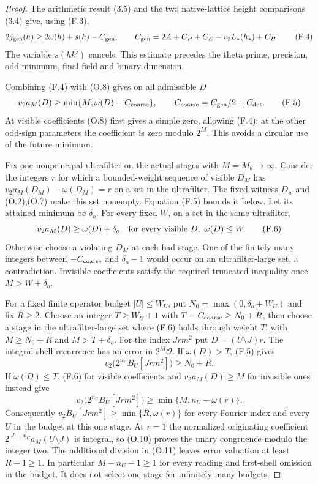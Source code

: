 \documentclass[11pt]{article}
\theoremstyle{definition}
\theoremstyle{remark}
\begin{document}
\begin{proof}\leavevmode
The arithmetic result (3.5) and the two native-lattice height
comparisons (3.4) give, using (F.3),
\[
 2j_{\rm gen}(h)\ge2\omega(h)+s(h)-C_{\rm gen},\qquad
 C_{\rm gen}=2A+C_R+C_E-v_2L_*(h_*)+C_H.                         \tag{F.4}
\]
The variable $s(hk')$ cancels. This estimate precedes the theta
prime, precision, odd minimum, final field and binary dimension.

Combining (F.4) with (O.8) gives on all admissible $D$
\[
            v_2a_M(D)\ge\min\{M,\omega(D)-C_{\rm coarse}\},
 \qquad C_{\rm coarse}=C_{\rm gen}/2+C_{\rm det}.                 \tag{F.5}
\]
At visible coefficients (O.8) first gives a simple zero, allowing
(F.4); at the other odd-sign parameters the coefficient is zero
modulo $2^M$. This avoids a circular use of the future minimum.

Fix one nonprincipal ultrafilter on the actual stages with
$M=M_\theta\to\infty$. Consider the integers $r$ for which a
bounded-weight sequence of visible $D_M$ has
$v_2a_M(D_M)-\omega(D_M)=r$ on a set in the ultrafilter.
The fixed witness $D_w$ and (O.2),(O.7) make this set nonempty.
Equation (F.5) bounds it below. Let its attained minimum be
$\delta_o$. For every fixed $W$, on a set in the same ultrafilter,
\[
 v_2a_M(D)\ge\omega(D)+\delta_o
             \quad\hbox{for every visible }D,\ \omega(D)\le W.
 \tag{F.6}
\]
Otherwise choose a violating $D_M$ at each bad stage. One of the
finitely many integers between $-C_{\rm coarse}$ and
$\delta_o-1$ would occur on an ultrafilter-large set, a contradiction.
Invisible coefficients satisfy the required truncated inequality
once $M>W+\delta_o$.

For a fixed finite operator budget $|U|\le W_U$, put
$N_0=\max(0,\delta_o+W_U)$ and fix $R\ge2$.
Choose an integer $T\ge W_U+1$ with
$T-C_{\rm coarse}\ge N_0+R$, then choose a stage in the
ultrafilter-large set where (F.6) holds through weight $T$, with
$M\ge N_0+R$ and $M>T+\delta_o$.
For the index $Jrm^2$ put $D=(U\setminus J)r$.
The integral shell recurrence has an error in $2^M\mathcal O$.
If $\omega(D)>T$, (F.5) gives
\[
 v_2\bigl(2^{n_U}B_U[Jrm^2]\bigr)\ge N_0+R.
\]
If $\omega(D)\le T$, (F.6) for visible coefficients and
$v_2a_M(D)\ge M$ for invisible ones instead give
\[
 v_2\bigl(2^{n_U}B_U[Jrm^2]\bigr)
       \ge\min\{M,n_U+\omega(r)\}.
\]
Consequently $v_2B_U[Jrm^2]\ge\min\{R,\omega(r)\}$ for every
Fourier index and every $U$ in the budget at this one stage.
At $r=1$ the normalized originating coefficient
$2^{|J|-n_U}a_M(U\setminus J)$ is integral, so (O.10) proves
the unary congruence modulo the integer two.
The additional division in (O.11) leaves error valuation at least
$R-1\ge1$.  In particular $M-n_U-1\ge1$ for every reading and
first-shell omission in the budget.
It does not select one stage for infinitely many budgets.


\end{proof}
\end{document}
